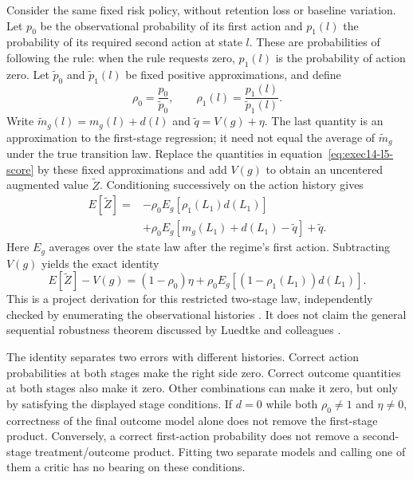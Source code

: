 Consider the same fixed risk policy, without retention loss or baseline
variation. Let $p_0$ be the observational probability of its first action and
$p_1(l)$ the probability of its required second action at state $l$. These are
probabilities of following the rule: when the rule requests zero, $p_1(l)$ is
the probability of action zero. Let $\widetilde p_0$ and
$\widetilde p_1(l)$ be fixed positive approximations, and define
\[
 \rho_0=\frac{p_0}{\widetilde p_0},\qquad
 \rho_1(l)=\frac{p_1(l)}{\widetilde p_1(l)}.
\]
Write $\widetilde m_g(l)=m_g(l)+d(l)$ and
$\widetilde q=V(g)+\eta$. The last quantity is an approximation to the
first-stage regression; it need not equal the average of
$\widetilde m_g$ under the true transition law. Replace the quantities in
equation~\eqref{eq:exec14-l5-score} by these fixed approximations and add
$V(g)$ to obtain an uncentered augmented value $\widetilde Z$. Conditioning
successively on the action history gives
\begin{align*}
 E[\widetilde Z]
 ={}&-\rho_0E_g[\rho_1(L_1)d(L_1)]\\
 &+\rho_0E_g[m_g(L_1)+d(L_1)-\widetilde q]
   +\widetilde q.
\end{align*}
Here $E_g$ averages over the state law after the regime's first action.
Subtracting $V(g)$ yields the exact identity
\begin{equation}
 E[\widetilde Z]-V(g)
 =(1-\rho_0)\eta
   +\rho_0E_g[(1-\rho_1(L_1))d(L_1)].
 \label{eq:exec14-l5-remainder}
\end{equation}
This is a project derivation for this restricted two-stage law, independently
checked by enumerating the observational histories
\cite{exec14_workflow_remainder}. It does not claim the general sequential
robustness theorem discussed by Luedtke and colleagues
\cite{sequentialdr2018}.

The identity separates two errors with different histories. Correct action
probabilities at both stages make the right side zero. Correct outcome
quantities at both stages also make it zero. Other combinations can make it
zero, but only by satisfying the displayed stage conditions. If $d=0$ while
both $\rho_0\neq1$ and $\eta\neq0$, correctness of the final outcome model
alone does not remove the first-stage product. Conversely, a correct
first-action probability does not remove a second-stage treatment/outcome
product. Fitting two separate models and calling one of them a critic has no
bearing on these conditions.

